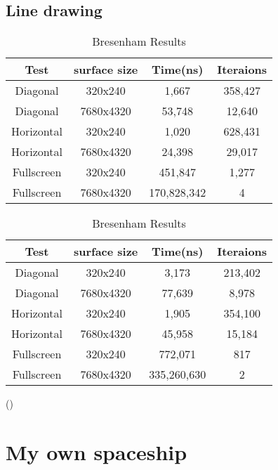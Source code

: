 \documentclass[
	letterpaper, %
	10pt, %
]{CSUniSchoolLabReport}
\begin{document}
\subsection{Line drawing}
\begin{table}[!htb]
    \caption{Line Benchmark Results}
    \begin{minipage}{.5\linewidth}
      \caption{DDA Results}
      \centering
        \begin{tabular}{c c c c}
            Test & surface size & Time(ns) & Iteraions \\ [0.5ex]
			\hline
			Diagonal & 320x240 & 1,667 & 358,427 \\
			Diagonal & 7680x4320 & 53,748 & 12,640 \\
			Horizontal & 320x240 & 1,020 & 628,431  \\
			Horizontal & 7680x4320 & 24,398 & 29,017 \\
			Fullscreen & 320x240 & 451,847 & 1,277 \\
			Fullscreen & 7680x4320 & 170,828,342 & 4 \\
        \end{tabular}
    \end{minipage}%
	\vline
    \begin{minipage}{.5\linewidth}
      \centering
        \caption{Bresenham Results}
        \begin{tabular}{c c c c}
            Test & surface size & Time(ns) & Iteraions \\ [0.5ex]
			\hline
			Diagonal & 320x240 & 3,173 & 213,402 \\
			Diagonal & 7680x4320 & 77,639 & 8,978 \\
			Horizontal & 320x240 & 1,905 & 354,100 \\
			Horizontal & 7680x4320 & 45,958 & 15,184 \\
			Fullscreen & 320x240 & 772,071 & 817 \\
			Fullscreen & 7680x4320 & 335,260,630 & 2 \\
        \end{tabular}
    \end{minipage} 
\end{table}
(\cite{Madan:2014})
\section{My own spaceship}

\subsection*{}

\printbibliography%

\end{document}
